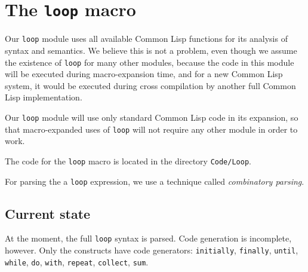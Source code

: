 \chapter{The \texttt{loop} macro} 

Our \texttt{loop} module uses all available Common Lisp functions for
its analysis of syntax and semantics.  We believe this is not a
problem, even though we assume the existence of \texttt{loop} for many
other modules, because the code in this module will be executed during
macro-expansion time, and for a new Common Lisp system, it would be
executed during cross compilation by another full Common Lisp
implementation.

Our \texttt{loop} module will use only standard Common Lisp code in
its expansion, so that macro-expanded uses of \texttt{loop} will not
require any other \sysname{} module in order to work.  

The code for the \sysname{} \texttt{loop} macro is located in the
directory \texttt{Code/Loop}.  

For parsing the a \texttt{loop} expression, we use a technique called
\emph{combinatory parsing}.

\section{Current state}

At the moment, the full \texttt{loop} syntax is parsed.  Code
generation is incomplete, however.  Only the constructs have code
generators: \texttt{initially}, \texttt{finally}, \texttt{until},
\texttt{while}, \texttt{do}, \texttt{with}, \texttt{repeat},
\texttt{collect}, \texttt{sum}.



